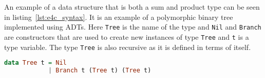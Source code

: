 \documentclass[10pt]{report}
\newcommand{\KIKO}[1]{\textcolor{red}{\textbf{[Kiko: #1]}}}
\def\code#1{\texttt{#1}} %
\begin{document}
\par{An example of a data structure that is both a sum and product type can be seen in listing~\ref{lst:e4c_syntax}. It is an example of a polymorphic binary tree implemented using ADTs. Here \code{Tree} is the name of the type and \code{Nil} and \code{Branch} are constructors that are used to create new instances of type \code{Tree} and \code{t} is a type variable. The type \code{Tree} is also recursive as it is defined in terms of itself.}


\begin{lstlisting}[language=Haskell,caption={Binary tree definition in Haskell},label={lst:e4c_syntax}]
data Tree t = Nil
            | Branch t (Tree t) (Tree t)
\end{lstlisting}


\end{document}
